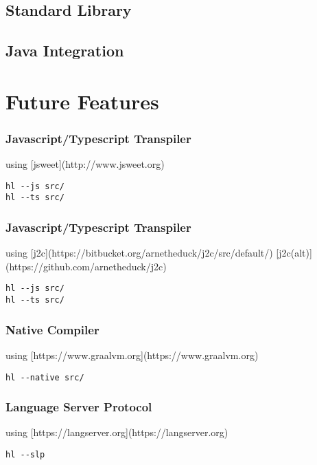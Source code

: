 \documentclass{tufte-book}
\begin{document}
        \chapter{Standard Library}
        \chapter{Java Integration}

    \part{Future Features}
        \section{Javascript/Typescript Transpiler}
        using [jsweet](http://www.jsweet.org)
        \begin{lstlisting}
hl --js src/
hl --ts src/
        \end{lstlisting}
        \section{Javascript/Typescript Transpiler}
        using [j2c](https://bitbucket.org/arnetheduck/j2c/src/default/)
        [j2c(alt)](https://github.com/arnetheduck/j2c)
        \begin{lstlisting}
hl --js src/
hl --ts src/
        \end{lstlisting}
        \section{Native Compiler}
        using [https://www.graalvm.org](https://www.graalvm.org)
        \begin{lstlisting}
hl --native src/
        \end{lstlisting}
        \section{Language Server Protocol}
        using [https://langserver.org](https://langserver.org)
        \begin{lstlisting}
hl --slp
        \end{lstlisting}



    \backmatter

    
    


    \printindex
	
\end{document}

